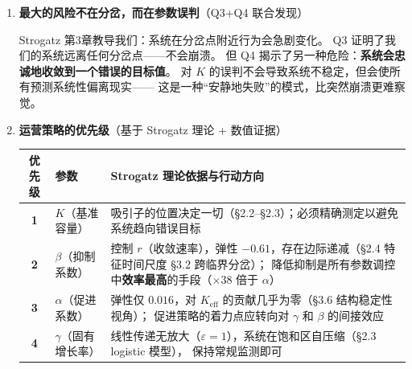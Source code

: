 \documentclass[12pt,a4paper]{article}
\begin{document}
\begin{enumerate}[label=\textbf{\arabic*.}]
\item \textbf{最大的风险不在分岔，而在参数误判}（Q3+Q4 联合发现）

Strogatz 第3章教导我们：系统在分岔点附近行为会急剧变化。
Q3 证明了我们的系统远离任何分岔点——不会崩溃。
但 Q4 揭示了另一种危险：\textbf{系统会忠诚地收敛到一个错误的目标值}。
对 $K$ 的误判不会导致系统不稳定，但会使所有预测系统性偏离现实——
这是一种``安静地失败''的模式，比突然崩溃更难察觉。

\item \textbf{运营策略的优先级}（基于 Strogatz 理论 + 数值证据）

\begin{center}
\begin{tabular}{clp{8cm}}
\toprule
优先级 & 参数 & Strogatz 理论依据与行动方向 \\
\midrule
\textbf{1} & $K$（基准容量） &
吸引子的位置决定一切（\S2.2--\S2.3）；必须精确测定以避免系统趋向错误目标 \\

\textbf{2} & $\beta$（抑制系数） &
控制 $r$（收敛速率），弹性 $-0.61$，存在边际递减（\S2.4 特征时间尺度 \S3.2 跨临界分岔）；
降低抑制是所有参数调控中\textbf{效率最高}的手段（$\times 38$ 倍于 $\alpha$） \\

\textbf{3} & $\alpha$（促进系数） &
弹性仅 $0.016$，对 $K_{\text{eff}}$ 的贡献几乎为零（\S3.6 结构稳定性视角）；
促进策略的着力点应转向对 $\gamma$ 和 $\beta$ 的间接效应 \\

\textbf{4} & $\gamma$（固有增长率） &
线性传递无放大（$\varepsilon = 1$），系统在饱和区自压缩（\S2.3 logistic 模型），
保持常规监测即可 \\

\bottomrule
\end{tabular}
\end{center}

\end{enumerate}

\vspace{12pt}

\begin{center}
\end{center}
\end{document}
